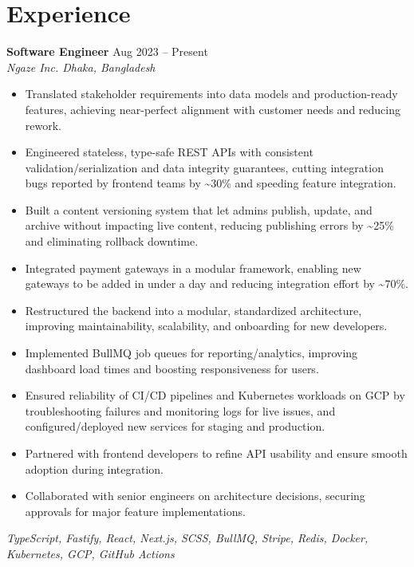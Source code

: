 \documentclass[a4paper,10pt]{article}
\begin{document}
\vspace{6pt}

\section*{Experience}

\textbf{Software Engineer} \hfill Aug 2023 -- Present\\[-2pt]
\textit{Ngaze Inc. \textbar{} Dhaka, Bangladesh}\\[-4pt]
\begin{itemize}
  \item Translated stakeholder requirements into data models and production-ready features, achieving near-perfect alignment with customer needs and reducing rework.
  \item Engineered stateless, type-safe REST APIs with consistent validation/serialization and data integrity guarantees, cutting integration bugs reported by frontend teams by \textasciitilde{}30\% and speeding feature integration.
  \item Built a content versioning system that let admins publish, update, and archive without impacting live content, reducing publishing errors by \textasciitilde{}25\% and eliminating rollback downtime.
  \item Integrated payment gateways in a modular framework, enabling new gateways to be added in under a day and reducing integration effort by \textasciitilde{}70\%.
  \item Restructured the backend into a modular, standardized architecture, improving maintainability, scalability, and onboarding for new developers.
  \item Implemented BullMQ job queues for reporting/analytics, improving dashboard load times and boosting responsiveness for users.
  \item Ensured reliability of CI/CD pipelines and Kubernetes workloads on GCP by troubleshooting failures and monitoring logs for live issues, and configured/deployed new services for staging and production.
  \item Partnered with frontend developers to refine API usability and ensure smooth adoption during integration.
  \item Collaborated with senior engineers on architecture decisions, securing approvals for major feature implementations.
\end{itemize}
\emph{TypeScript, Fastify, React, Next.js, SCSS, BullMQ, Stripe, Redis, Docker, Kubernetes, GCP, GitHub Actions}
\end{document}
